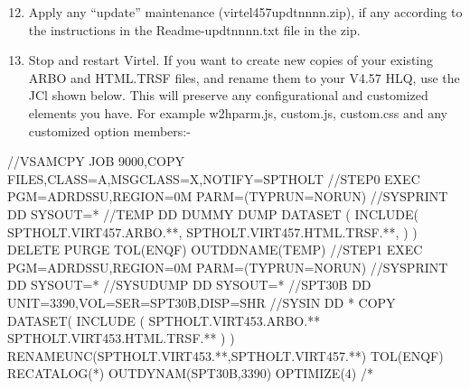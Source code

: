 \documentclass[letterpaper,10pt,english]{sphinxmanual}
\begin{document}
\newpage
\begin{enumerate}
\setcounter{enumi}{11}
\item {} 
Apply any “update” maintenance (virtel457updtnnnn.zip), if any according to the instructions in the Readme-updtnnnn.txt file in the zip.

\item {} 
Stop and restart Virtel. If you want to create new copies of your existing ARBO and HTML.TRSF files, and rename them to your V4.57 HLQ, use the JCl shown below. This will preserve any configurational and customized elements you have. For example w2hparm.js, custom.js, custom.css and any customized option members:-

\end{enumerate}

\begin{sphinxVerbatim}[commandchars=\\\{\}]
//\PYGZdl{}VSAMCPY JOB 9000,\PYGZsq{}COPY FILES\PYGZsq{},CLASS=A,MSGCLASS=X,NOTIFY=SPTHOLT
//STEP0   EXEC PGM=ADRDSSU,REGION=0M PARM=(\PYGZsq{}TYPRUN=NORUN\PYGZsq{})
//SYSPRINT DD SYSOUT=*
//TEMP DD DUMMY
 DUMP DATASET              \PYGZhy{}
      (                    \PYGZhy{}
       INCLUDE(            \PYGZhy{}
      SPTHOLT.VIRT457.ARBO.**, \PYGZhy{}
      SPTHOLT.VIRT457.HTML.TRSF.**, \PYGZhy{}
                )         \PYGZhy{}
      )                   \PYGZhy{}
      DELETE    \PYGZhy{}
      PURGE      \PYGZhy{}
      TOL(ENQF) \PYGZhy{}
      OUTDDNAME(TEMP)
//STEP1   EXEC PGM=ADRDSSU,REGION=0M PARM=(\PYGZsq{}TYPRUN=NORUN\PYGZsq{})
//SYSPRINT DD  SYSOUT=*
//SYSUDUMP DD  SYSOUT=*
//SPT30B   DD  UNIT=3390,VOL=SER=SPT30B,DISP=SHR
//SYSIN    DD  *
 COPY                                             \PYGZhy{}
       DATASET(                                   \PYGZhy{}
       INCLUDE (                                  \PYGZhy{}
       SPTHOLT.VIRT453.ARBO.**                    \PYGZhy{}
       SPTHOLT.VIRT453.HTML.TRSF.**               \PYGZhy{}
  )                                               \PYGZhy{}
  )\PYGZhy{}
  RENAMEUNC(SPTHOLT.VIRT453.**,SPTHOLT.VIRT457.**) \PYGZhy{}
  TOL(ENQF)   \PYGZhy{}
  RECATALOG(*) \PYGZhy{}
  OUTDYNAM(SPT30B,3390) \PYGZhy{}
  OPTIMIZE(4)
/*
\end{sphinxVerbatim}


\newpage

\end{document}
